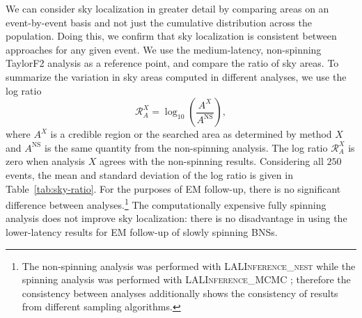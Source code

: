We can consider sky localization in greater detail by comparing areas on an event-by-event basis and not just the cumulative distribution across the population. Doing this, we confirm that sky localization is consistent between approaches for any given event. We use the medium-latency, non-spinning TaylorF2 analysis as a reference point, and compare the ratio of sky areas. To summarize the variation in sky areas computed in different analyses, we use the log ratio
\begin{equation}
\mathcal{R}_A^X = \log_{10}\left(\frac{A^X}{A^\mathrm{NS}}\right),
\end{equation}
where $A^X$ is a credible region or the searched area as determined by method $X$ and $A^\mathrm{NS}$ is the same quantity from the non-spinning analysis. The log ratio $\mathcal{R}_A^X$ is zero when analysis $X$ agrees with the non-spinning results. Considering all $250$ events, the mean and standard deviation of the log ratio is given in Table~\ref{tab:sky-ratio}. For the purposes of EM follow-up, there is no significant difference between analyses.\footnote{The non-spinning analysis was performed with \textsc{LALInference\_nest} while the spinning analysis was performed with \textsc{LALInference\_MCMC} \citep{Veitch_2014}; therefore the consistency between analyses additionally shows the consistency of results from different sampling algorithms.} The computationally expensive fully spinning analysis does not improve sky localization: there is no disadvantage in using the lower-latency results for EM follow-up of slowly spinning BNSs.
  
  
  
  
  
  
  